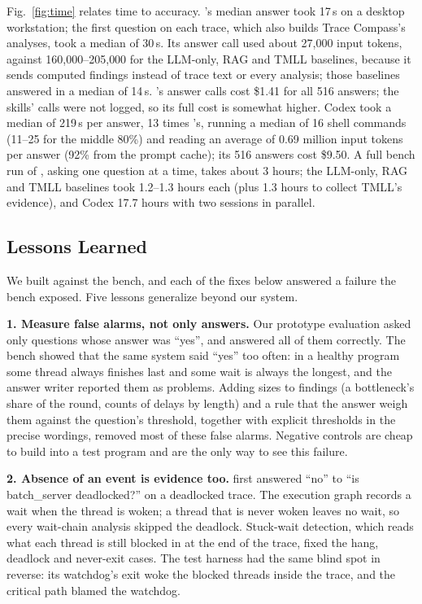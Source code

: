 Fig.~\ref{fig:time} relates time to accuracy.
\sysname's median answer took 17\,s on a desktop workstation; the first question on each trace, which also builds Trace Compass's analyses, took a median of 30\,s. Its answer call used about 27{,}000 input tokens, against 160{,}000--205{,}000 for the LLM-only, RAG and TMLL baselines, because it sends computed findings instead of trace text or every analysis; those baselines answered in a median of 14\,s. \sysname's answer calls cost \$1.41 for all 516 answers; the skills' calls were not logged, so its full cost is somewhat higher. Codex took a median of 219\,s per answer, 13 times \sysname's, running a median of 16 shell commands (11--25 for the middle 80\%) and reading an average of 0.69 million input tokens per answer (92\% from the prompt cache); its 516 answers cost \$9.50. A full bench run of \sysname, asking one question at a time, takes about 3 hours; the LLM-only, RAG and TMLL baselines took 1.2--1.3 hours each (plus 1.3 hours to collect TMLL's evidence), and Codex 17.7 hours with two sessions in parallel.

\subsection{Lessons Learned}
\label{sec:lessons}

We built \sysname against the bench, and each of the fixes below answered a failure the bench exposed. Five lessons generalize beyond our system.

\textbf{1. Measure false alarms, not only answers.} Our prototype evaluation asked only questions whose answer was ``yes'', and \sysname answered all of them correctly. The bench showed that the same system said ``yes'' too often: in a healthy program some thread always finishes last and some wait is always the longest, and the answer writer reported them as problems. Adding sizes to findings (a bottleneck's share of the round, counts of delays by length) and a rule that the answer weigh them against the question's threshold, together with explicit thresholds in the precise wordings, removed most of these false alarms. Negative controls are cheap to build into a test program and are the only way to see this failure.

\textbf{2. Absence of an event is evidence too.} \sysname first answered ``no'' to ``is batch\_server deadlocked?'' on a deadlocked trace. The execution graph records a wait when the thread is woken; a thread that is never woken leaves no wait, so every wait-chain analysis skipped the deadlock. Stuck-wait detection, which reads what each thread is still blocked in at the end of the trace, fixed the hang, deadlock and never-exit cases. The test harness had the same blind spot in reverse: its watchdog's exit woke the blocked threads inside the trace, and the critical path blamed the watchdog.

